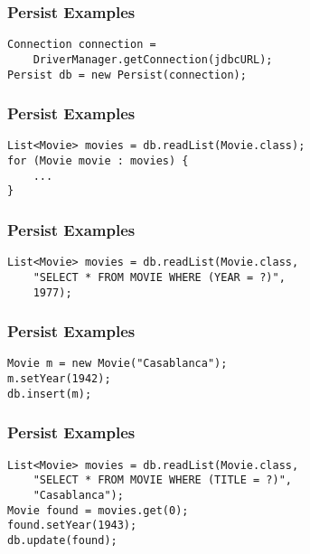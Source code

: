 \documentclass[dvipsnames]{beamer}
\theoremstyle{plain}
\begin{document}
\begin{frame}[fragile]
  \frametitle{Persist Examples}

  \begin{example}
    \begin{lstlisting}
Connection connection =
    DriverManager.getConnection(jdbcURL);
Persist db = new Persist(connection);
    \end{lstlisting}
  \end{example}
\end{frame}

\begin{frame}[fragile]
  \frametitle{Persist Examples}

  \begin{example}
    \begin{lstlisting}
List<Movie> movies = db.readList(Movie.class);
for (Movie movie : movies) {
    ...
}
    \end{lstlisting}
  \end{example}
\end{frame}

\begin{frame}[fragile]
  \frametitle{Persist Examples}

  \begin{example}
    \begin{lstlisting}
List<Movie> movies = db.readList(Movie.class,
    "SELECT * FROM MOVIE WHERE (YEAR = ?)",
    1977);
    \end{lstlisting}
  \end{example}
\end{frame}

\begin{frame}[fragile]
  \frametitle{Persist Examples}

  \begin{example}[insert]
    \begin{lstlisting}
Movie m = new Movie("Casablanca");
m.setYear(1942);
db.insert(m);
    \end{lstlisting}
  \end{example}
\end{frame}

\begin{frame}[fragile]
  \frametitle{Persist Examples}

  \begin{example}[update]
    \begin{lstlisting}
List<Movie> movies = db.readList(Movie.class,
    "SELECT * FROM MOVIE WHERE (TITLE = ?)",
    "Casablanca");
Movie found = movies.get(0);
found.setYear(1943);
db.update(found);
    \end{lstlisting}
  \end{example}
\end{frame}
\end{document}
